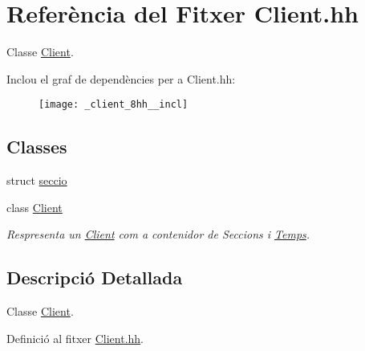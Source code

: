 \hypertarget{_client_8hh}{\section{Referència del Fitxer Client.\-hh}
\label{_client_8hh}
}


Classe \hyperlink{class_client}{Client}.  


Inclou el graf de dependències per a Client.\-hh\-:\nopagebreak
\begin{figure}[H]
\begin{center}
\leavevmode
\texttt{[image: \_client\_8hh\_\_incl]}
\end{center}
\end{figure}
\subsection*{Classes}
\begin{DoxyCompactItemize}
\item 
struct \hyperlink{structseccio}{seccio}
\item 
class \hyperlink{class_client}{Client}
\begin{DoxyCompactList}\small\item\em Respresenta un \hyperlink{class_client}{Client} com a contenidor de Seccions i \hyperlink{class_temps}{Temps}. \end{DoxyCompactList}\end{DoxyCompactItemize}


\subsection{Descripció Detallada}
Classe \hyperlink{class_client}{Client}. 

Definició al fitxer \hyperlink{_client_8hh_source}{Client.\-hh}.

